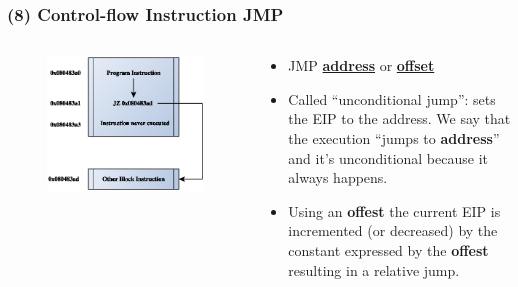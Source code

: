 \documentclass[]{beamer}
\begin{document}
\begin{frame}
  \frametitle{(8) Control-flow Instruction JMP}
  \begin{columns}
    \begin{column}{0.4\columnwidth}
      \begin{figure}
        \includegraphics[width=1.2\textwidth]{images/jmp.eps}

        \label{Control Flow JMP}
      \end{figure}
    \end{column}
    \begin{column}{0.6\columnwidth}
      \begin{itemize}
      \item{JMP \underline{\textbf{address}} or \underline{\textbf{offset}}}\\

      \item{Called ``unconditional jump'': sets the EIP to the address. We say that the execution ``jumps to \textbf{address}'' and it's unconditional because it always happens.}
      \item{Using an \textbf{offest} the current EIP is incremented (or decreased) by the constant expressed by the \textbf{offest} resulting in a relative jump.}
      \end{itemize}
    \end{column}
  \end{columns}
\end{frame}
\end{document}
